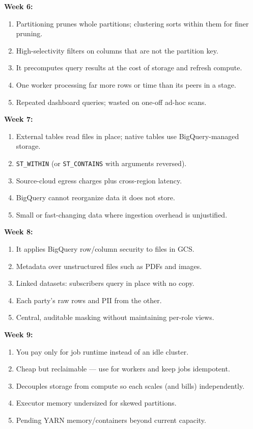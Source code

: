 \documentclass[11pt, a4paper]{article}
\begin{document}
\textbf{Week 6:}
\begin{enumerate}[nosep, leftmargin=1.5em]
    \item Partitioning prunes whole partitions; clustering sorts within them for finer pruning.
    \item High-selectivity filters on columns that are not the partition key.
    \item It precomputes query results at the cost of storage and refresh compute.
    \item One worker processing far more rows or time than its peers in a stage.
    \item Repeated dashboard queries; wasted on one-off ad-hoc scans.
\end{enumerate}

\textbf{Week 7:}
\begin{enumerate}[nosep, leftmargin=1.5em]
    \item External tables read files in place; native tables use BigQuery-managed storage.
    \item \texttt{ST\_WITHIN} (or \texttt{ST\_CONTAINS} with arguments reversed).
    \item Source-cloud egress charges plus cross-region latency.
    \item BigQuery cannot reorganize data it does not store.
    \item Small or fast-changing data where ingestion overhead is unjustified.
\end{enumerate}

\textbf{Week 8:}
\begin{enumerate}[nosep, leftmargin=1.5em]
    \item It applies BigQuery row/column security to files in GCS.
    \item Metadata over unstructured files such as PDFs and images.
    \item Linked datasets: subscribers query in place with no copy.
    \item Each party's raw rows and PII from the other.
    \item Central, auditable masking without maintaining per-role views.
\end{enumerate}

\textbf{Week 9:}
\begin{enumerate}[nosep, leftmargin=1.5em]
    \item You pay only for job runtime instead of an idle cluster.
    \item Cheap but reclaimable --- use for workers and keep jobs idempotent.
    \item Decouples storage from compute so each scales (and bills) independently.
    \item Executor memory undersized for skewed partitions.
    \item Pending YARN memory/containers beyond current capacity.
\end{enumerate}
\end{document}
